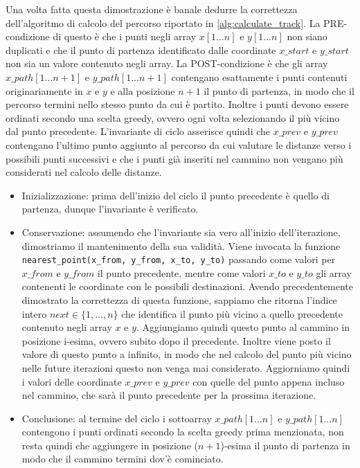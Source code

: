 Una volta fatta questa dimostrazione è banale dedurre la correttezza dell'algoritmo di calcolo del percorso riportato in \ref{alg:calculate_track}. La PRE-condizione di questo è che i punti negli array $x[1 \dotso n]$ e $y[1 \dotso n]$ non siano duplicati e che il punto di partenza identificato dalle coordinate $x\_start$ e $y\_start$ non sia un valore contenuto negli array. La POST-condizione è che gli array $x\_path[1 \dotso n+1]$ e $y\_path[1 \dotso n+1]$ contengano esattamente i punti contenuti originariamente in $x$ e $y$ e alla posizione $n+1$ il punto di partenza, in modo che il percorso termini nello stesso punto da cui è partito. Inoltre i punti devono essere ordinati secondo una scelta greedy, ovvero ogni volta selezionando il più vicino dal punto precedente. L'invariante di ciclo asserisce quindi che $x\_prev$ e $y\_prev$ contengano l'ultimo punto aggiunto al percorso da cui valutare le distanze verso i possibili punti successivi e che i punti già inseriti nel cammino non vengano più considerati nel calcolo delle distanze.

\begin{itemize}
    \item Inizializzazione: prima dell'inizio del ciclo il punto precedente è quello di partenza, dunque l'invariante è verificato.
    \item Conservazione: assumendo che l'invariante sia vero all'inizio dell'iterazione, dimostriamo il mantenimento della sua validità. Viene invocata la funzione \verb|nearest_point(x_from, y_from, x_to, y_to)| passando come valori per $x\_from$ e $y\_from$ il punto precedente, mentre come valori $x\_to$ e $y\_to$ gli array contenenti le coordinate con le possibili destinazioni. Avendo precedentemente dimostrato la correttezza di questa funzione, sappiamo che ritorna l'indice intero $next \in \{ 1, \dotso, n \}$ che identifica il punto più vicino a quello precedente contenuto negli array $x$ e $y$. Aggiungiamo quindi questo punto al cammino in posizione i-esima, ovvero subito dopo il precedente. Inoltre viene posto il valore di questo punto a infinito, in modo che nel calcolo del punto più vicino nelle future iterazioni questo non venga mai considerato. Aggiorniamo quindi i valori delle coordinate $x\_prev$ e $y\_prev$ con quelle del punto appena incluso nel cammino, che sarà il punto precedente per la prossima iterazione.
    \item Conclusione: al termine del ciclo i sottoarray $x\_path[1\dotso n]$ e $y\_path[1 \dotso n]$ contengono i punti ordinati secondo la scelta greedy prima menzionata, non resta quindi che aggiungere in posizione ($n+1$)-esima il punto di partenza in modo che il cammino termini dov'è cominciato.
\end{itemize}

